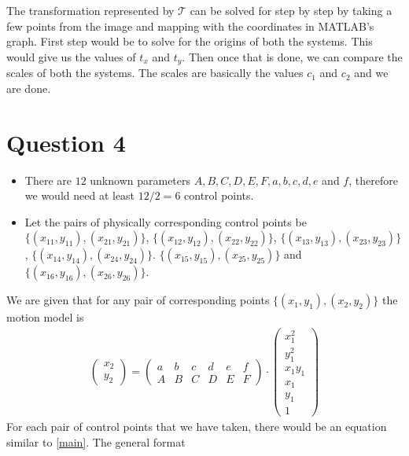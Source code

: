 \documentclass[12pt]{article}
\begin{document}
    The transformation represented by $\mathcal{T}$ can be solved for step by step by taking a few points from the image 
    and mapping with the coordinates in MATLAB's graph. First step would be to solve for the origins of both the systems.
    This would give us the values of $t_{x}$ and $t_{y}$. Then once that is done, we can compare the scales of both 
    the systems. The scales are basically the values $c_{1}$ and $c_{2}$ and we are done.
\section{Question 4}

    \begin{itemize}
        \item There are $12$ unknown parameters $A,B,C,D,E,F,a,b,c,d,e$ and $f$, therefore we would need at least $12/2 = 6$ 
        control points.
        \item Let the pairs of physically corresponding control points be $\{(x_{11},y_{11}),(x_{21},y_{21})\}$, 
        $\{(x_{12},y_{12}),(x_{22},y_{22})\}$, $\{(x_{13},y_{13}),(x_{23},y_{23})\}$, $\{(x_{14},y_{14}),(x_{24},y_{24})\}$.
        $\{(x_{15},y_{15}),(x_{25},y_{25})\}$ and $\{(x_{16},y_{16}),(x_{26},y_{26})\}$.
    \end{itemize}
    We are given that for any pair of
    corresponding points $\{(x_{1},y_{1}),(x_{2},y_{2})\}$ the motion model is
    \begin{align}
        \label{main}
        \begin{pmatrix}
            x_{2} \\
            y_{2}
        \end{pmatrix}
        =
        \begin{pmatrix}
            a & b & c & d & e & f \\
            A & B & C & D & E & F
        \end{pmatrix}
        \cdot
        \begin{pmatrix}
            x_{1}^{2} \\
            y_{1}^{2} \\
            x_{1}y_{1} \\
            x_{1} \\
            y_{1} \\
            1
        \end{pmatrix}
    \end{align}
    For each pair of control points that we have taken, there would be an equation similar to \ref{main}. The general format
\end{document}
